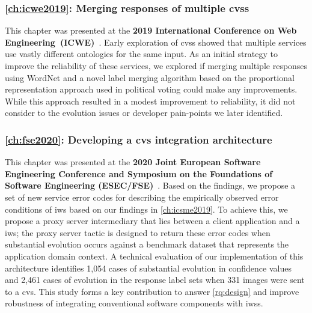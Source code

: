 \subsubsection[Chapter 8: Merging responses of multiple CVSs]{\cref{ch:icwe2019}: Merging responses of multiple \glspl{cvs}} This chapter was presented at the \textbf{2019 International Conference on Web Engineering~(ICWE)}~\citep{Ohtake:2019vi}. Early exploration of \glspl{cvs} showed that multiple services use vastly different ontologies for the same input. As an initial strategy to improve the reliability of these services, we explored if merging multiple responses using WordNet \citep{WordNetMiller1995} and a novel label merging algorithm based on the proportional representation approach used in political voting could make any improvements. While this approach resulted in a modest improvement to reliability, it did not consider to the evolution issues or developer pain-points we later identified.

\subsubsection[Chapter 9: Developing a CVS integration architecture]{\cref{ch:fse2020}: Developing a \gls{cvs} integration architecture} This chapter was presented at the \textbf{2020 Joint European Software Engineering Conference and Symposium on the Foundations of Software Engineering (ESEC/FSE)}~\citep{Cummaudo:2020fse}. Based on the findings, we propose a set of new service error codes for describing the empirically observed error conditions of \gls{iws} based on our findings in \cref{ch:icsme2019}. To achieve this, we propose a proxy server intermediary that lies between a client application and a \gls{iws}; the proxy server tactic is designed to return these error codes when substantial evolution occurs against a benchmark dataset that represents the application domain context. A technical evaluation of our implementation of this architecture identifies 1,054 cases of substantial evolution in confidence values and 2,461 cases of evolution in the response label sets when 331 images were sent to a \gls{cvs}. This study forms a key contribution to answer \ref{rq:design} and improve robustness of integrating conventional software components with \glspl{iws}.

